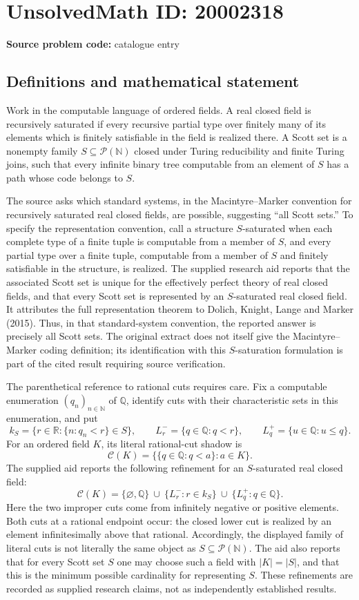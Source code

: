 \documentclass[11pt]{article}
\newcommand{\N}{\mathbb{N}}
\newcommand{\Q}{\mathbb{Q}}
\newcommand{\R}{\mathbb{R}}
\begin{document}
\section*{UnsolvedMath ID: 20002318}
\textbf{Source problem code:} catalogue entry
\subsection{Definitions and mathematical statement}
Work in the computable language of ordered fields. A real closed field is recursively saturated if every recursive partial type over finitely many of its elements which is finitely satisfiable in the field is realized there. A Scott set is a nonempty family $S\subseteq\mathcal P(\N)$ closed under Turing reducibility and finite Turing joins, such that every infinite binary tree computable from an element of $S$ has a path whose code belongs to $S$.

The source asks which standard systems, in the Macintyre--Marker convention for recursively saturated real closed fields, are possible, suggesting ``all Scott sets.'' To specify the representation convention, call a structure $S$-saturated when each complete type of a finite tuple is computable from a member of $S$, and every partial type over a finite tuple, computable from a member of $S$ and finitely satisfiable in the structure, is realized. The supplied research aid reports that the associated Scott set is unique for the effectively perfect theory of real closed fields, and that every Scott set is represented by an $S$-saturated real closed field. It attributes the full representation theorem to Dolich, Knight, Lange and Marker (2015). Thus, in that standard-system convention, the reported answer is precisely all Scott sets. The original extract does not itself give the Macintyre--Marker coding definition; its identification with this $S$-saturation formulation is part of the cited result requiring source verification.

The parenthetical reference to rational cuts requires care. Fix a computable enumeration $(q_n)_{n\in\N}$ of $\Q$, identify cuts with their characteristic sets in this enumeration, and put
\[
 k_S=\{r\in\R:\{n:q_n<r\}\in S\},\qquad
 L_r^-=\{q\in\Q:q<r\},\qquad L_q^+=\{u\in\Q:u\le q\}.
\]
For an ordered field $K$, its literal rational-cut shadow is
\[
 \mathcal C(K)=\bigl\{\{q\in\Q:q<a\}:a\in K\bigr\}.
\]
The supplied aid reports the following refinement for an $S$-saturated real closed field:
\[
 \mathcal C(K)=\{\varnothing,\Q\}\ \cup\ \{L_r^-:r\in k_S\}\ \cup\ \{L_q^+:q\in\Q\}.
\]
Here the two improper cuts come from infinitely negative or positive elements. Both cuts at a rational endpoint occur: the closed lower cut is realized by an element infinitesimally above that rational. Accordingly, the displayed family of literal cuts is not literally the same object as $S\subseteq\mathcal P(\N)$. The aid also reports that for every Scott set $S$ one may choose such a field with $|K|=|S|$, and that this is the minimum possible cardinality for representing $S$. These refinements are recorded as supplied research claims, not as independently established results.
\end{document}

